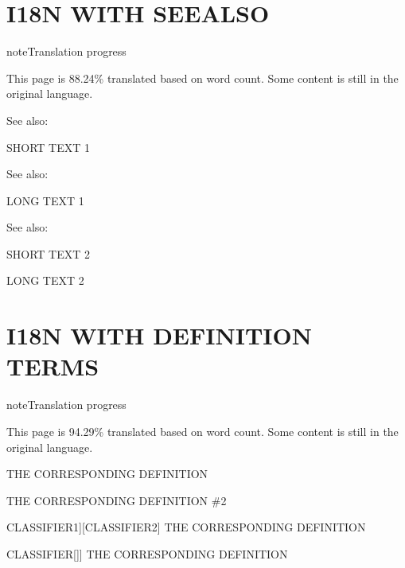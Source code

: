 \documentclass[letterpaper,10pt,english]{sphinxmanual}
\begin{document}
\sphinxstepscope


\chapter{I18N WITH SEEALSO}
\label{\detokenize{seealso:i18n-with-seealso}}\label{\detokenize{seealso::doc}}
\begin{sphinxadmonition}{note}{Translation progress}

\sphinxAtStartPar
This page is 88.24\% translated based on word count. Some content is still in the original language.
\end{sphinxadmonition}


\begin{sphinxseealso}{See also:}

\sphinxAtStartPar
SHORT TEXT 1


\end{sphinxseealso}



\begin{sphinxseealso}{See also:}

\sphinxAtStartPar
LONG TEXT 1


\end{sphinxseealso}



\begin{sphinxseealso}{See also:}

\sphinxAtStartPar
SHORT TEXT 2

\sphinxAtStartPar
LONG TEXT 2


\end{sphinxseealso}


\sphinxstepscope


\chapter{I18N WITH DEFINITION TERMS}
\label{\detokenize{definition_terms:i18n-with-definition-terms}}\label{\detokenize{definition_terms::doc}}
\begin{sphinxadmonition}{note}{Translation progress}

\sphinxAtStartPar
This page is 94.29\% translated based on word count. Some content is still in the original language.
\end{sphinxadmonition}
\begin{description}
\sphinxAtStartPar
THE CORRESPONDING DEFINITION

\sphinxAtStartPar
THE CORRESPONDING DEFINITION \#2

\sphinxlineitem{SOME \sphinxstylestrong{TERM} WITH}{[}CLASSIFIER1{]}{[}CLASSIFIER2{]}
\sphinxAtStartPar
THE CORRESPONDING DEFINITION

\sphinxlineitem{SOME TERM WITH}{[}CLASSIFIER{[}{]}{]}
\sphinxAtStartPar
THE CORRESPONDING DEFINITION

\end{description}
\end{document}
